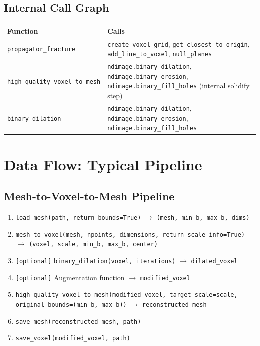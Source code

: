 \documentclass[12pt,a4paper]{article}
\begin{document}
\subsection{Internal Call Graph}

\begin{table}[H]
\centering
\begin{tabular}{lp{9cm}}
\toprule
\textbf{Function} & \textbf{Calls} \\
\midrule
\texttt{propagator\_fracture} & \texttt{create\_voxel\_grid}, \texttt{get\_closest\_to\_origin}, \texttt{add\_line\_to\_voxel}, \texttt{null\_planes} \\
\texttt{high\_quality\_voxel\_to\_mesh} & \texttt{ndimage.binary\_dilation}, \texttt{ndimage.binary\_erosion}, \texttt{ndimage.binary\_fill\_holes} (internal solidify step) \\
\texttt{binary\_dilation} & \texttt{ndimage.binary\_dilation}, \texttt{ndimage.binary\_erosion}, \texttt{ndimage.binary\_fill\_holes} \\
\bottomrule
\end{tabular}
\end{table}

\newpage

\section{Data Flow: Typical Pipeline}

\subsection{Mesh-to-Voxel-to-Mesh Pipeline}

\begin{enumerate}[leftmargin=1.5em]
  \item \texttt{load\_mesh(path, return\_bounds=True)} $\rightarrow$ \texttt{(mesh, min\_b, max\_b, dims)}
  \item \texttt{mesh\_to\_voxel(mesh, npoints, dimensions, return\_scale\_info=True)} $\rightarrow$ \texttt{(voxel, scale, min\_b, max\_b, center)}
  \item \texttt{[optional]} \texttt{binary\_dilation(voxel, iterations)} $\rightarrow$ \texttt{dilated\_voxel}
  \item \texttt{[optional]} Augmentation function $\rightarrow$ \texttt{modified\_voxel}
  \item \texttt{high\_quality\_voxel\_to\_mesh(modified\_voxel, target\_scale=scale, original\_bounds=(min\_b, max\_b))} $\rightarrow$ \texttt{reconstructed\_mesh}
  \item \texttt{save\_mesh(reconstructed\_mesh, path)}
  \item \texttt{save\_voxel(modified\_voxel, path)}
\end{enumerate}
\end{document}
